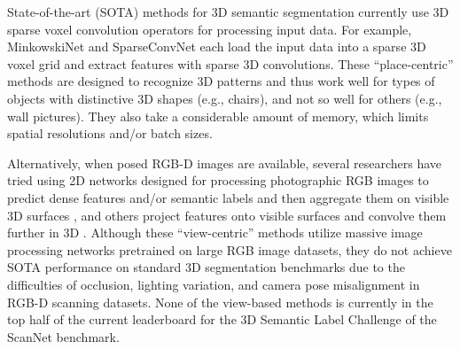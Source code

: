 \documentclass[runningheads]{llncs}
\begin{document}
State-of-the-art (SOTA) methods for 3D semantic segmentation currently use 3D sparse voxel convolution operators for processing input data.   For example, MinkowskiNet \cite{choy20194d} and SparseConvNet \cite{graham20183d} each load the input data into a sparse 3D voxel grid and extract features with sparse 3D convolutions.   These ``place-centric'' methods are designed to recognize 3D patterns and thus work well for types of objects with distinctive 3D shapes (e.g., chairs), and not so well for others (e.g., wall pictures).   They also take a considerable amount of memory, which limits spatial resolutions and/or batch sizes.

Alternatively, when posed RGB-D images are available, several researchers have tried using 2D networks designed for processing photographic RGB images to predict dense features and/or semantic labels and then aggregate them on visible 3D surfaces \cite{hermans2014dense,vineet2015incremental}, and others project features onto visible surfaces and convolve them further in 3D \cite{dai20183dmv,semanticpaint,jaritz2019multi,lai2014unsupervised}.   Although these ``view-centric'' methods utilize massive image processing networks pretrained on large RGB image datasets, they do not achieve SOTA performance on standard 3D segmentation benchmarks due to the difficulties of occlusion, lighting variation, and camera pose misalignment in RGB-D scanning datasets.  None of the view-based methods is currently in the top half of the current leaderboard for the 3D Semantic Label Challenge of the ScanNet benchmark.
\end{document}
